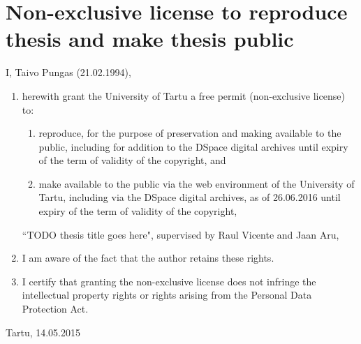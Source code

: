 \documentclass[a4paper,12pt]{report}
\theoremstyle{definition}
\begin{document}
\section*{Non-exclusive license to reproduce thesis and make thesis public}
I, Taivo Pungas (21.02.1994), 
\begin{enumerate}
	\item herewith grant the University of Tartu a free permit (non-exclusive license) to:
	\begin{enumerate}[label*=\arabic*.]
		\renewcommand{\theenumi}{\arabic{enumi}}
		\item reproduce, for the purpose of preservation and making available to the public, including for addition to the DSpace digital archives until expiry of the term of validity of the copyright, and
		\item make available to the public via the web environment of the University of Tartu, including via the DSpace digital archives, as of 26.06.2016 until expiry of the term of validity of the copyright,
	\end{enumerate}
	``TODO thesis title goes here", supervised by Raul Vicente and Jaan Aru,
	
	\item I am aware of the fact that the author retains these rights.

	\item I certify that granting the non-exclusive license does not infringe the intellectual property rights or rights arising from the Personal Data Protection Act. 
\end{enumerate}

Tartu, 14.05.2015

\thispagestyle{empty}
\newpage
\end{document}
